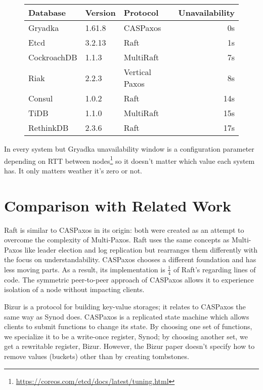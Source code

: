 \documentclass[12pt]{article}
\theoremstyle{definition}
\begin{document}
\begin{figure}[!h]
  \centering
  \begin{tabular}{|l|l|l|r|}
  \hline
  Database & Version & Protocol & Unavailability\\
  \hline
  \hline
  Gryadka & 1.61.8 & CASPaxos & 0s\\
  Etcd & 3.2.13 & Raft & 1s\\
  CockroachDB & 1.1.3 & MultiRaft & 7s\\
  Riak & 2.2.3 & Vertical Paxos & 8s\\
  Consul & 1.0.2 & Raft & 14s\\
  TiDB & 1.1.0 & MultiRaft & 15s\\
  RethinkDB & 2.3.6 & Raft & 17s\\
  \hline
  \end{tabular}
\end{figure}

In every system but Gryadka unavailability window is a configuration parameter depending on RTT between nodes\footnote{\href{https://coreos.com/etcd/docs/latest/tuning.html}{https://coreos.com/etcd/docs/latest/tuning.html}} so it doesn't matter which value each system has. It only matters weather it's zero or not.

\section{Comparison with Related Work}

Raft is similar to CASPaxos in its origin: both were created as an attempt to overcome the complexity of Multi-Paxos. Raft uses the same concepts as Multi-Paxos like leader election and log replication but rearranges them differently with the focus on understandability. CASPaxos chooses a different foundation and has less moving parts. As a result, its implementation is $\frac{1}{4}$ of Raft's regarding lines of code. The symmetric peer-to-peer approach of CASPaxos allows it to experience isolation of a node without impacting clients.

Bizur is a protocol for building key-value storages; it relates to CASPaxos the same way as Synod does. CASPaxos is a replicated state machine which allows clients to submit functions to change its state. By choosing one set of functions, we specialize it to be a write-once register, Synod; by choosing another set, we get a rewritable register, Bizur. However, the Bizur paper doesn't specify how to remove values (buckets) other than by creating tombstones.
\end{document}
